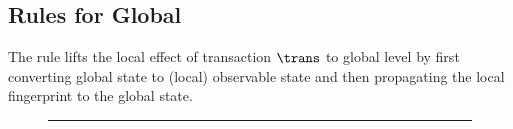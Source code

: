 \subsection{Rules for Global}

The  rule lifts the local effect of transaction \( \trans \) to global level by first converting global state to (local) observable state and then propagating the local fingerprint to the global state.


\begin{figure}[t!]
\hrule\vspace{5pt}




\end{figure}
